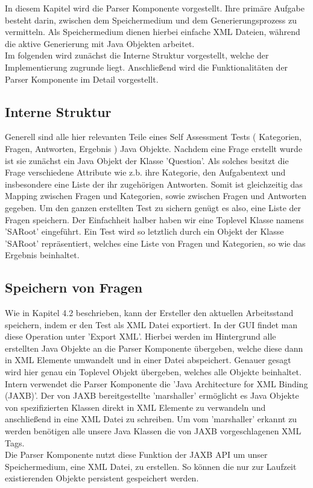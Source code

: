 \label{Tim}
In diesem Kapitel wird die Parser Komponente vorgestellt. Ihre primäre Aufgabe besteht darin, zwischen dem Speichermedium und dem Generierungsprozess zu vermitteln. Als Speichermedium dienen hierbei einfache XML Dateien, während die aktive Generierung mit Java Objekten arbeitet.\\
Im folgenden wird zunächst die Interne Struktur vorgestellt, welche der Implementierung zugrunde liegt. Anschließend wird die Funktionalitäten der Parser Komponente im Detail vorgestellt. 

\subsection{Interne Struktur}
Generell sind alle hier relevanten Teile eines Self Assessment Tests ( Kategorien, Fragen, Antworten, Ergebnis ) Java Objekte. 
Nachdem eine Frage erstellt wurde ist sie zunächst ein Java Objekt der Klasse 'Question'. Als solches besitzt die Frage verschiedene Attribute wie z.b. ihre Kategorie, den Aufgabentext und insbesondere eine Liste der ihr zugehörigen Antworten. Somit ist gleichzeitig das Mapping zwischen Fragen und Kategorien, sowie zwischen Fragen und Antworten gegeben. Um den ganzen erstellten Test zu sichern genügt es also, eine Liste der Fragen speichern. Der Einfachheit halber haben wir eine Toplevel Klasse namens 'SARoot' eingeführt. Ein Test wird so letztlich durch ein Objekt der Klasse 'SARoot' repräsentiert, welches eine Liste von Fragen und Kategorien, so wie das Ergebnis beinhaltet.   

\subsection{Speichern von Fragen}
Wie in Kapitel 4.2 beschrieben, kann der Ersteller den aktuellen Arbeitsstand speichern, indem er den Test als XML Datei exportiert. In der GUI findet man diese Operation unter 'Export XML'.
Hierbei werden im Hintergrund alle erstellten Java Objekte an die Parser Komponente übergeben, welche diese dann in XML Elemente umwandelt und in einer Datei abspeichert. Genauer gesagt wird hier genau ein Toplevel Objekt übergeben, welches alle Objekte beinhaltet.\\
Intern verwendet die Parser Komponente die 'Java Architecture for XML Binding (JAXB)'\cite{JAXB}. Der von JAXB\cite{JAXB} bereitgestellte 'marshaller' ermöglicht es Java Objekte von spezifizierten Klassen direkt in XML Elemente zu verwandeln und anschließend in eine XML Datei zu schreiben. Um vom 'marshaller' erkannt zu werden benötigen alle unsere Java Klassen die von JAXB\cite{JAXB} vorgeschlagenen XML Tags.\\
Die Parser Komponente nutzt diese Funktion der JAXB\cite{JAXB} API um unser Speichermedium, eine XML Datei, zu erstellen. So können die nur zur Laufzeit existierenden Objekte persistent gespeichert werden.

